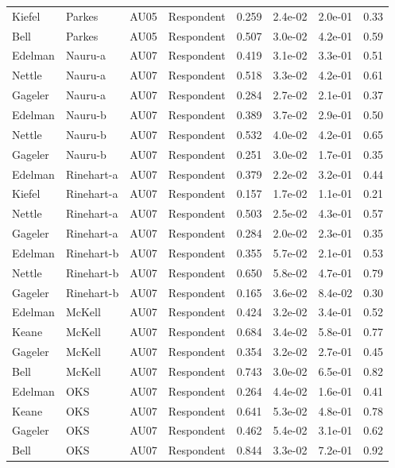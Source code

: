 \documentclass{monashthesis}
\begin{document}
\begin{center}
\begin{longtable}{llllllll}
Kiefel & Parkes & AU05 & Respondent & 0.259 & 2.4e-02 & 2.0e-01 & 0.33 \\
Bell & Parkes & AU05 & Respondent & 0.507 & 3.0e-02 & 4.2e-01 & 0.59 \\
Edelman & Nauru-a & AU07 & Respondent & 0.419 & 3.1e-02 & 3.3e-01 & 0.51 \\
Nettle & Nauru-a & AU07 & Respondent & 0.518 & 3.3e-02 & 4.2e-01 & 0.61 \\
Gageler & Nauru-a & AU07 & Respondent & 0.284 & 2.7e-02 & 2.1e-01 & 0.37 \\
Edelman & Nauru-b & AU07 & Respondent & 0.389 & 3.7e-02 & 2.9e-01 & 0.50 \\
Nettle & Nauru-b & AU07 & Respondent & 0.532 & 4.0e-02 & 4.2e-01 & 0.65 \\
Gageler & Nauru-b & AU07 & Respondent & 0.251 & 3.0e-02 & 1.7e-01 & 0.35 \\
Edelman & Rinehart-a & AU07 & Respondent & 0.379 & 2.2e-02 & 3.2e-01 & 0.44 \\
Kiefel & Rinehart-a & AU07 & Respondent & 0.157 & 1.7e-02 & 1.1e-01 & 0.21 \\
Nettle & Rinehart-a & AU07 & Respondent & 0.503 & 2.5e-02 & 4.3e-01 & 0.57 \\
Gageler & Rinehart-a & AU07 & Respondent & 0.284 & 2.0e-02 & 2.3e-01 & 0.35 \\
Edelman & Rinehart-b & AU07 & Respondent & 0.355 & 5.7e-02 & 2.1e-01 & 0.53 \\
Nettle & Rinehart-b & AU07 & Respondent & 0.650 & 5.8e-02 & 4.7e-01 & 0.79 \\
Gageler & Rinehart-b & AU07 & Respondent & 0.165 & 3.6e-02 & 8.4e-02 & 0.30 \\
Edelman & McKell & AU07 & Respondent & 0.424 & 3.2e-02 & 3.4e-01 & 0.52 \\
Keane & McKell & AU07 & Respondent & 0.684 & 3.4e-02 & 5.8e-01 & 0.77 \\
Gageler & McKell & AU07 & Respondent & 0.354 & 3.2e-02 & 2.7e-01 & 0.45 \\
Bell & McKell & AU07 & Respondent & 0.743 & 3.0e-02 & 6.5e-01 & 0.82 \\
Edelman & OKS & AU07 & Respondent & 0.264 & 4.4e-02 & 1.6e-01 & 0.41 \\
Keane & OKS & AU07 & Respondent & 0.641 & 5.3e-02 & 4.8e-01 & 0.78 \\
Gageler & OKS & AU07 & Respondent & 0.462 & 5.4e-02 & 3.1e-01 & 0.62 \\
Bell & OKS & AU07 & Respondent & 0.844 & 3.3e-02 & 7.2e-01 & 0.92 \\

\end{longtable}
\end{center}
\end{document}

